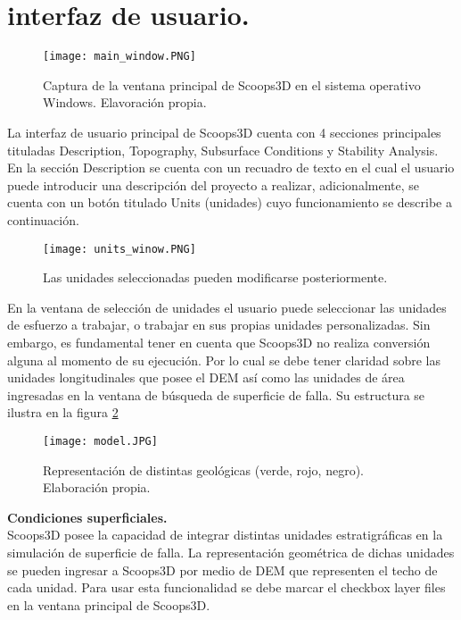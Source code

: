 \section{interfaz de usuario.}

\begin{figure}[h]
\centering
\texttt{[image: main\_window.PNG]}
\caption{Captura de la ventana principal de Scoops3D en el sistema operativo Windows. Elavoraci\'on propia.}
\label{fig:Interfaz de usuario}
\end{figure}

La interfaz de usuario principal de Scoops3D  cuenta con 4 secciones principales tituladas Description, Topography, Subsurface Conditions y Stability Analysis. En la secci\'{o}n Description se cuenta con un recuadro de texto en el cual el usuario puede introducir una descripci\'{o}n del proyecto a realizar, adicionalmente, se cuenta con un bot\'{o}n titulado Units (unidades) cuyo funcionamiento se describe a continuaci\'{o}n. \\

\begin{figure}[H]
\centering
\texttt{[image: units\_winow.PNG]}
\caption{Las unidades seleccionadas pueden modificarse posteriormente.}
\label{unidades}
\end{figure}


En la ventana de selecci\'{o}n de unidades el usuario puede seleccionar las unidades de
esfuerzo a trabajar, o trabajar en sus propias unidades personalizadas. Sin embargo, es
fundamental tener en cuenta que Scoops3D no realiza conversi\'{o}n alguna al momento de su
ejecuci\'{o}n. Por lo cual se debe tener claridad sobre las unidades longitudinales que posee el
DEM as\'{i} como las unidades de \'{a}rea ingresadas en la ventana de b\'{u}squeda de superficie de
falla. Su estructura se ilustra en la figura \ref{unidades}
\\
\begin{figure}[h]
\centering
\texttt{[image: model.JPG]}
\caption{Representaci\'on de distintas geol\'ogicas (verde, rojo, negro). Elaboraci\'on propia.}
\label{geo-units}
\end{figure}


\textbf{Condiciones superficiales.}\\
Scoops3D posee la capacidad de integrar distintas unidades estratigr\'{a}ficas en la simulaci\'{o}n
de superficie de falla. La representaci\'{o}n geom\'{e}trica de dichas unidades se pueden ingresar
a Scoops3D por medio de DEM que representen el techo de cada unidad.
Para usar esta funcionalidad se debe marcar el checkbox layer files en la ventana principal
de Scoops3D.
\\

